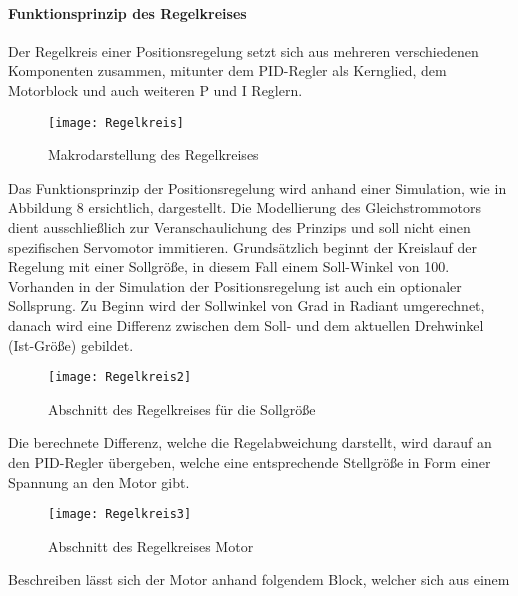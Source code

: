 \documentclass[titlepage,12pt,twoside]{article}
\begin{document}
\paragraph{Funktionsprinzip des Regelkreises}
\hfill \break
\hfill \break
Der Regelkreis einer Positionsregelung setzt sich aus mehreren verschiedenen 
Komponenten zusammen, mitunter dem PID-Regler als Kernglied, dem Motorblock und 
auch weiteren P und I Reglern. \\
\begin{figure}[H]
	\begin{center}
		\scalebox{1.2}
		{\texttt{[image: Regelkreis]}}
		\caption{Makrodarstellung des Regelkreises}
		\label{fig:Regelkreis}
	\end{center}
\end{figure}
\hfill \break
Das Funktionsprinzip der Positionsregelung wird anhand einer Simulation, wie in Abbildung 8 ersichtlich, dargestellt. Die Modellierung des Gleichstrommotors dient ausschließlich zur Veranschaulichung des Prinzips und soll nicht einen spezifischen Servomotor immitieren.
Grundsätzlich beginnt der Kreislauf der Regelung mit einer Sollgröße, in diesem Fall 
einem Soll-Winkel von 100\textdegree. Vorhanden in der Simulation der Positionsregelung ist auch 
ein optionaler Sollsprung. Zu Beginn wird der Sollwinkel von Grad in Radiant 
umgerechnet, danach wird eine Differenz zwischen dem Soll- und dem aktuellen 
Drehwinkel (Ist-Größe) gebildet. \\
\begin{figure}[H]
	\begin{center}
		\scalebox{1}
		{\texttt{[image: Regelkreis2]}}
		\caption{Abschnitt des Regelkreises für die Sollgröße}
		\label{fig:Regelkreis2}
	\end{center}
\end{figure}
\hfill \break
Die berechnete Differenz, welche die Regelabweichung darstellt, wird darauf an den 
PID-Regler übergeben, welche eine entsprechende Stellgröße in Form einer Spannung an 
den Motor gibt. \\
\begin{figure}[H]
	\begin{center}
		\scalebox{1}
		{\texttt{[image: Regelkreis3]}}
		\caption{Abschnitt des Regelkreises Motor}
		\label{fig:Regelkreis3}
	\end{center}
\end{figure}
\hfill \break
Beschreiben lässt sich der Motor anhand folgendem Block, welcher sich aus einem 
\end{document}
